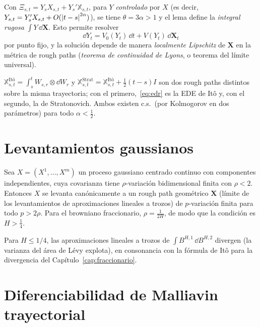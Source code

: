 Con $\Xi_{s,t}=Y_sX_{s,t}+Y_s'\mathbb X_{s,t}$, para $Y$ \emph{controlado} por $X$ (es decir, $Y_{s,t}=Y_s'X_{s,t}+O(\left\lvert t-s\right\rvert^{2\alpha})$),
se tiene $\theta=3\alpha>1$ y el lema define la \emph{integral rugosa} $\int Y\,\dd\mathbf X$. Esto permite resolver
\begin{equation}\label{eq:edr}
  \dd Y_t=V_0(Y_t)\,\dd t+V(Y_t)\,\dd\mathbf X_t
\end{equation}
por punto fijo, y la solución depende de manera \emph{localmente Lipschitz} de $\mathbf X$ en la métrica de
rough paths (\emph{teorema de continuidad de Lyons}, o teorema del límite universal).

\begin{ejemplo}[Browniano]
$\mathbb X^{\text{Itô}}_{s,t}=\int_s^tW_{s,r}\otimes\dd W_r$ y $\mathbb X^{\text{Strat}}_{s,t}=\mathbb X^{\text{Itô}}_{s,t}+\frac12(t-s)I$ son dos rough
paths distintos sobre la misma trayectoria; con el primero,~\eqref{eq:edr} es la EDE de Itô y, con el
segundo, la de Stratonovich. Ambos existen c.s.\ (por Kolmogorov en dos parámetros) para todo
$\alpha<\frac12$.
\end{ejemplo}

\section{Levantamientos gaussianos}

\begin{teorema}
Sea $X=(X^1,\dots,X^m)$ un proceso gaussiano centrado
continuo con componentes independientes, cuya covarianza tiene $\rho$-variación bidimensional
finita con $\rho<2$. Entonces $X$ se levanta canónicamente a un rough path geométrico $\mathbf X$ (límite
de los levantamientos de aproximaciones lineales a trozos) de $p$-variación finita para todo
$p>2\rho$. Para el browniano fraccionario, $\rho=\frac1{2H}$, de modo que la condición es $H>\frac14$.
\end{teorema}

Para $H\le1/4$, las aproximaciones lineales a trozos de $\int B^{H,1}\,\dd B^{H,2}$ divergen (la varianza del
área de Lévy explota), en consonancia con la fórmula de Itô para la divergencia del Capítulo~\ref{cap:fraccionario}.

\section{Diferenciabilidad de Malliavin trayectorial}

